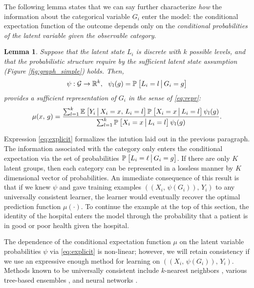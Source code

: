 \documentclass{article}
\theoremstyle{plain}
\newtheorem{lemm}[prop]{Lemma}
\theoremstyle{definition}
\theoremstyle{remark}
\begin{document}
The following lemma states that we can say further characterize \emph{how} the information about the categorical variable $G_{i}$ enter the model: the conditional expectation function of the outcome depends only on the \emph{conditional probabilities of the latent variable given the observable category}.

\begin{lemm}
\label{lemm:repr}
Suppose that the latent state $L_i$ is discrete with $k$ possible levels, and that the probabilistic structure require by the sufficient latent state assumption (Figure \ref{fig:graph_simple}) holds. Then,
\begin{equation}
\label{eq:psi}
\psi: \mathcal{G} \rightarrow \mathbb{R}^k, \ \ \psi_l(g) = \mathbb{P}_{}\left[L_i = l \,\big|\, G_i = g\right]
\end{equation}
provides a sufficient representation of $G_i$ in the sense of \eqref{eq:repr}:
\begin{equation}
\label{eq:explicit}
\mu(x, \, g) = \frac{\sum_{l = 1}^k  \mathbb{E}_{}\left[Y_i \,\big|\, X_i = x, \, L_i = l\right] \mathbb{P}_{}\left[X_i = x \,\big|\, L_i = l\right] \psi_l(g)}{\sum_{l = 1}^k \mathbb{P}_{}\left[X_i = x \,\big|\, L_i = l\right] \psi_l(g)}.
\end{equation}
\end{lemm}

Expression \eqref{eq:explicit} formalizes the intution laid out in the previous paragraph. The information associated with the category only enters the conditional expectation via the set of probabilities $\mathbb{P}_{}\left[L_{i} = \ell \,\big|\, G_{i} = g\right]$. If there are only $K$ latent groups, then each category can be represented in a lossless manner by $K$ dimensional vector of probabilities. An immediate consequence of this result is that if we knew $\psi$ and gave training examples $((X_i, \, \psi(G_i)), \, Y_i)$ to any universally consistent learner, the learner would eventually recover the optimal prediction function $\mu(\cdot)$. To continue the example at the top of this section, the identity of the hospital enters the model through the probability that a patient is in good or poor health given the hospital.

The dependence of the conditional expectation function $\mu$ on the latent variable probabilities $\psi$ via \eqref{eq:explicit} is non-linear; however, we will retain consistency if we use an expressive enough method for learning on $((X_i, \, \psi(G_i)), \, Y_i)$. Methods known to be universally consistent include $k$-nearest neighbors \citep{stone1977consistent}, various tree-based ensembles \citep{biau2008consistency}, and neural networks \citep{farago1993strong}.
\end{document}
